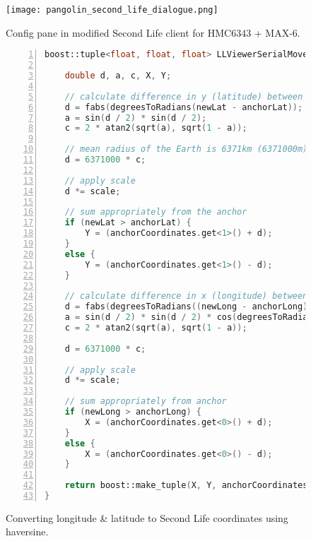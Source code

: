 \begin{figure}[h]
\centering
  \texttt{[image: pangolin\_second\_life\_dialogue.png]}
  \caption{Config pane in modified Second Life client for HMC6343 + MAX-6.}
  \label{pangolin_second_life_dialogue.png}
\end{figure}

\begin{figure}[h]
\begin{lstlisting}[language=C++, numbers=left, numberstyle=\small, stepnumber=1, frame=single, breaklines=true, backgroundcolor=\color{codebackground}, showstringspaces=false]
boost::tuple<float, float, float> LLViewerSerialMovement::latitudeLongitudeToRegionCoordinate(double newLat, double newLong, float anchorLat, float anchorLong, float scale, boost::tuple<float, float, float> anchorCoordinates) {

    double d, a, c, X, Y;

    // calculate difference in y (latitude) between anchor & new reading
    d = fabs(degreesToRadians(newLat - anchorLat));
    a = sin(d / 2) * sin(d / 2);
    c = 2 * atan2(sqrt(a), sqrt(1 - a));

    // mean radius of the Earth is 6371km (6371000m)
    d = 6371000 * c;

    // apply scale
    d *= scale;

    // sum appropriately from the anchor
    if (newLat > anchorLat) {
        Y = (anchorCoordinates.get<1>() + d);
    }
    else {
        Y = (anchorCoordinates.get<1>() - d);
    }

    // calculate difference in x (longitude) between anchor & new reading
    d = fabs(degreesToRadians((newLong - anchorLong)));
    a = sin(d / 2) * sin(d / 2) * cos(degreesToRadians(newLat)) * cos(degreesToRadians(anchorLat));
    c = 2 * atan2(sqrt(a), sqrt(1 - a));
    
    d = 6371000 * c;

    // apply scale
    d *= scale;

    // sum appropriately from anchor
    if (newLong > anchorLong) {
        X = (anchorCoordinates.get<0>() + d);
    }
    else {
        X = (anchorCoordinates.get<0>() - d);
    }

    return boost::make_tuple(X, Y, anchorCoordinates.get<2>());
}
\end{lstlisting}
\caption{Converting longitude \& latitude to Second Life coordinates using haversine.}
\label{secondlifehaversine}
\end{figure}

